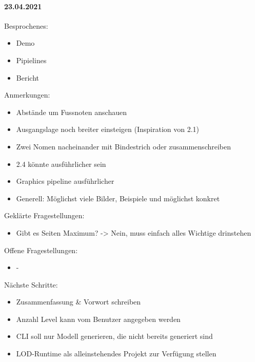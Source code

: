 \newpage

\paragraph{23.04.2021}
Besprochenes:
\begin{itemize}
  \item Demo
  \item Pipielines
  \item Bericht
\end{itemize}
Anmerkungen:
\begin{itemize}
  \item Abstände um Fussnoten anschauen
  \item Ausgangslage noch breiter einsteigen (Inspiration von 2.1)
  \item Zwei Nomen nacheinander mit Bindestrich oder zusammenschreiben
  \item 2.4 könnte ausführlicher sein
  \item Graphics pipeline ausführlicher
  \item Generell: Möglichst viele Bilder, Beispiele und möglichst konkret
\end{itemize}
Geklärte Fragestellungen:
\begin{itemize}
  \item Gibt es Seiten Maximum? -> Nein, muss einfach alles Wichtige drinstehen
\end{itemize}
Offene Fragestellungen:
\begin{itemize}
  \item -
\end{itemize}
Nächste Schritte:
\begin{itemize}
  \item Zusammenfassung \& Vorwort schreiben
  \item Anzahl Level kann vom Benutzer angegeben werden
  \item CLI soll nur Modell generieren, die nicht bereits generiert sind
  \item LOD-Runtime als alleinstehendes Projekt zur Verfügung stellen
\end{itemize}

\newpage


